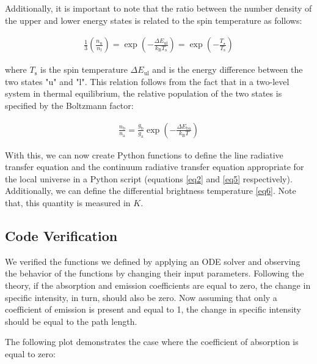 \documentclass[apj]{emulateapj}
\begin{document}
Additionally, it is important to note that the ratio between the number density of the upper and lower energy states is related to the spin temperature as follows: 

\begin{equation}
\begin{aligned}
\frac{1}{3}\left(\frac{n_{\mathrm{u}}}{n_{\mathrm{l}}}\right)=\exp \left(-\frac{\Delta E_{\mathrm{ul}}}{k_{\mathrm{B}} T_{\mathrm{s}}}\right)=\exp \left(-\frac{T_{\star}}{T_{\mathrm{s}}}\right)
\end{aligned}
\end{equation}

where $T_{\mathrm{s}}$ is the spin temperature $\Delta E_{\mathrm{ul}}$ and is the energy difference between the two states "u" and "l". This relation follows from the fact that in a two-level system in thermal equilibrium, the relative population of the two states is specified by the Boltzmann factor:

\begin{equation}
\begin{aligned}
\frac{n_{\mathrm{b}}}{n_{\mathrm{a}}}=\frac{g_{\mathrm{b}}}{g_{\mathrm{a}}} \exp \left(-\frac{\Delta E_{\mathrm{ba}}}{k_{\mathrm{B}} T}\right)
\end{aligned}
\end{equation}

With this, we can now create Python functions to define the line radiative transfer equation and the continuum radiative transfer equation appropriate for the local universe in a Python script (equations \eqref{eq2} and \eqref{eq5} respectively). Additionally, we can define the differential brightness temperature \eqref{eq6}. Note that, this quantity is measured in $K$.

\subsection{Code Verification}
We verified the functions we defined by applying an ODE solver and observing the behavior of the functions by changing their input parameters. Following the theory, if the absorption and emission coefficients are equal to zero, the change in specific intensity, in turn, should also be zero. Now assuming that only a coefficient of emission is present and equal to 1, the change in specific intensity should be equal to the path length.

The following plot demonstrates the case where the coefficient of absorption is equal to zero:
\end{document}
